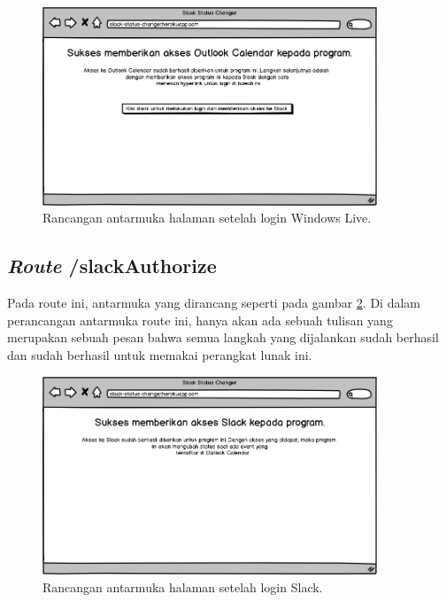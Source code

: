 \begin{figure}[h]
  \includegraphics[width=10cm]{./Gambar/MockUp/Step2.png}
  \centering
  \caption{Rancangan antarmuka halaman setelah login Windows Live.}
  \label{fig:mockup_halaman_kedua}
\end{figure}

\subsection{\textit{Route} /slackAuthorize}
Pada route ini, antarmuka yang dirancang seperti pada gambar \ref{fig:mockup_halaman_ketiga}. Di dalam perancangan antarmuka route ini, hanya akan ada sebuah tulisan yang merupakan sebuah pesan bahwa semua langkah yang dijalankan sudah berhasil dan sudah berhasil untuk memakai perangkat lunak ini.  

\begin{figure}[h]
  \includegraphics[width=10cm]{./Gambar/MockUp/Step3.png}
  \centering
  \caption{Rancangan antarmuka halaman setelah login Slack.}
  \label{fig:mockup_halaman_ketiga}
\end{figure}

